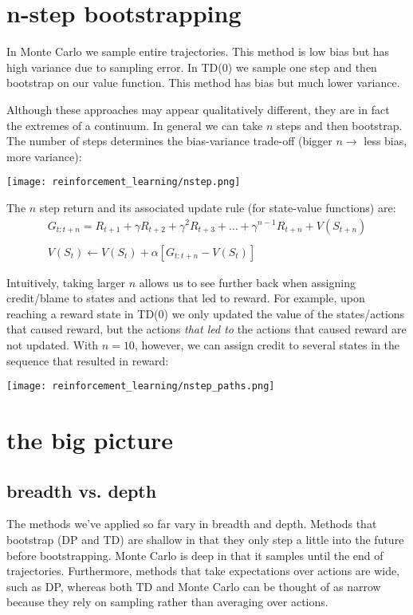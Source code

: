 \section{n-step bootstrapping}
In Monte Carlo we sample entire trajectories. This method is low bias but has high variance due to sampling error. In TD(0) we sample one step and then bootstrap on our value function. This method has bias but much lower variance.

Although these approaches may appear qualitatively different, they are in fact the extremes of a continuum. In general we can take $n$ steps and then bootstrap. The number of steps determines the bias-variance trade-off (bigger $n \rightarrow$ less bias, more variance):

\begin{center}\texttt{[image: reinforcement\_learning/nstep.png]}\end{center}

The $n$ step return and its associated update rule (for state-value functions) are:
\begin{gather*}
G_{t:t+n} = R_{t+1} + \gamma  R_{t+2} + \gamma^2  R_{t+3} + \dots + \gamma^{n-1}  R_{t+n} + V(S_{t+n}) \\ \\
V(S_t) \leftarrow V(S_t) + \alpha [G_{t:t+n} - V(S_t)]
\end{gather*}

Intuitively, taking larger $n$ allows us to see further back when assigning credit/blame to states and actions that led to reward. For example, upon reaching a reward state in TD(0) we only updated the value of the states/actions that caused reward, but the actions \textit{that led to} the actions that caused reward are not updated. With $n=10$, however, we can assign credit to several states in the sequence that resulted in reward:

\begin{center}\texttt{[image: reinforcement\_learning/nstep\_paths.png]}\end{center}

\section{the big picture}
\subsection{breadth vs. depth}
The methods we've applied so far vary in breadth and depth. Methods that bootstrap (DP and TD) are shallow in that they only step a little into the future before bootstrapping. Monte Carlo is deep in that it samples until the end of trajectories. Furthermore, methods that take expectations over actions are wide, such as DP, whereas both TD and Monte Carlo can be thought of as narrow because they rely on sampling rather than averaging over actions.


